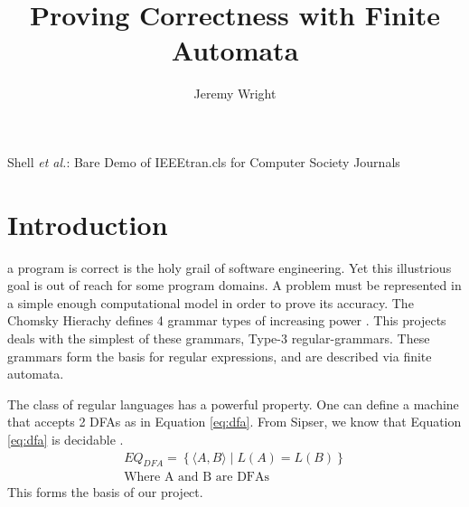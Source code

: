 \documentclass[12pt,journal,compsoc,draftcls]{IEEEtran}
\begin{document}
\title{Proving Correctness with Finite Automata}
\author{Jeremy Wright}
{Shell \MakeLowercase{\textit{et al.}}: Bare Demo of IEEEtran.cls for Computer Society Journals}

\maketitle


\IEEEdisplaynotcompsoctitleabstractindextext

\IEEEpeerreviewmaketitle

\section{Introduction}
 a program is correct is the holy grail of software
engineering. Yet this illustrious goal is out of reach for some program domains.
A problem must be represented in a simple enough computational model in order to
prove its accuracy. The Chomsky Hierachy defines 4 grammar types of increasing
power \cite{wiki-chomsky}. This projects deals with the simplest of these
grammars, Type-3 regular-grammars.  These grammars form the basis for regular
expressions, and are described via finite automata. 

The class of regular languages has a powerful property. One can define a machine
that accepts 2 DFAs as in Equation \ref{eq:dfa}. From Sipser, we know that
Equation \ref{eq:dfa} is decidable \cite[p.~169]{Sipser}.
\begin{multline}
    EQ_{DFA} = \left\{ \langle A, B \rangle  \mid  L( A ) = L( B ) \right\} \\
    \text{Where A and B are DFAs}
    \label{eq:dfa}
\end{multline}
This forms the basis of our project. 
\end{document}
